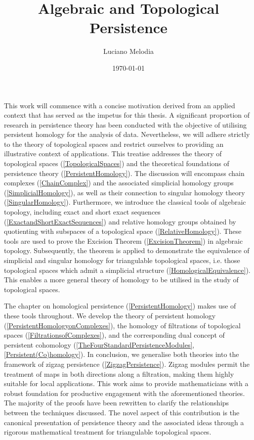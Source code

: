 \documentclass[b5paper, 11pt, twoside]{report}
\title{Algebraic and Topological Persistence}
\author{Luciano Melodia}
\date{\today}
\begin{document}


This work will commence with a concise motivation derived from an applied context that has served as the impetus for this thesis.  A significant proportion of research in persistence theory has been conducted with the objective of utilising persistent homology for the analysis of data. Nevertheless, we will adhere strictly to the theory of topological spaces and restrict ourselves to providing an illustrative context of applications. This treatise addresses the theory of topological spaces (\ref{TopologicalSpaces}) and the theoretical foundations of persistence theory (\ref{PersistentHomology}). The discussion will encompass chain complexes (\ref{ChainComplex}) and the associated simplicial homology groups (\ref{SimplicialHomology}), as well as their connection to singular homology theory (\ref{SingularHomology}). Furthermore, we introduce the classical tools of algebraic topology, including exact and short exact sequences (\ref{ExactandShortExactSequences}) and relative homology groups obtained by quotienting with subspaces of a topological space (\ref{RelativeHomology}). These tools are used to prove the Excision Theorem (\ref{ExcisionTheorem}) in algebraic topology. Subsequently, the theorem is applied to demonstrate the equivalence of simplicial and singular homology for triangulable topological spaces, i.e. those topological spaces which admit a simplicial structure (\ref{HomologicalEquivalence}). This enables a more general theory of homology to be utilised in the study of topological spaces.

The chapter on homological persistence (\ref{PersistentHomology}) makes use of these tools throughout. We develop the theory of persistent homology (\ref{PersistentHomologyonComplexes}), the homology of filtrations of topological spaces (\ref{FiltrationsofComplexes}), and the corresponding dual concept of persistent cohomology (\ref{TheFourStandardPersistenceModules}, \ref{Persistent(Co)homology}). In conclusion, we generalise both theories into the framework of zigzag persistence (\ref{ZigzagPersistence}). Zigzag modules permit the treatment of maps in both directions along a filtration, making them highly suitable for local applications. This work aims to provide mathematicians with a robust foundation for productive engagement with the aforementioned theories. The majority of the proofs have been rewritten to clarify the relationships between the techniques discussed. The novel aspect of this contribution is the canonical presentation of persistence theory and the associated ideas through a rigorous mathematical treatment for triangulable topological spaces.
\end{document}
